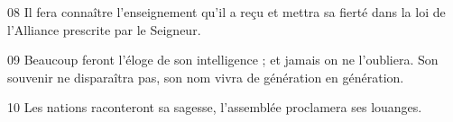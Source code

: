 
08 Il fera connaître l’enseignement qu’il a reçu et mettra sa fierté dans la loi de l’Alliance prescrite par le Seigneur.

09 Beaucoup feront l’éloge de son intelligence ; et jamais on ne l’oubliera. Son souvenir ne disparaîtra pas, son nom vivra de génération en génération.

10 Les nations raconteront sa sagesse, l’assemblée proclamera ses louanges.